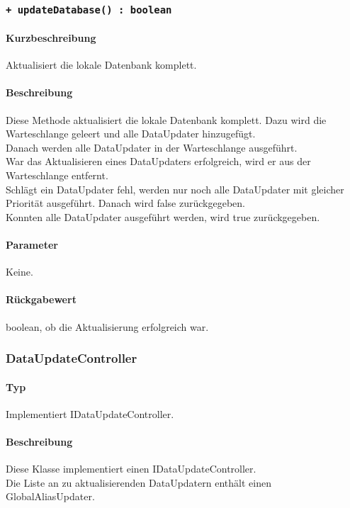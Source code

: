 \subsubsection*{\texttt{+ updateDatabase() : boolean}}%
\paragraph*{Kurzbeschreibung}
Aktualisiert die lokale Datenbank komplett.
\paragraph*{Beschreibung}
Diese Methode aktualisiert die lokale Datenbank komplett. 
Dazu wird die Warteschlange geleert und alle DataUpdater hinzugefügt.\\
Danach werden alle DataUpdater in der Warteschlange ausgeführt.\\
War das Aktualisieren eines DataUpdaters erfolgreich, wird er aus der Warteschlange entfernt.\\
Schlägt ein DataUpdater fehl, werden nur noch alle DataUpdater mit gleicher Priorität 
ausgeführt. Danach wird false zurückgegeben.\\
Konnten alle DataUpdater ausgeführt werden, wird true zurückgegeben.
\paragraph*{Parameter}
Keine.
\paragraph*{Rückgabewert}
boolean, ob die Aktualisierung erfolgreich war.

\subsubsection{DataUpdateController}
\paragraph*{Typ}
Implementiert IDataUpdateController.
\paragraph*{Beschreibung}
Diese Klasse implementiert einen IDataUpdateController.\\
Die Liste an zu aktualisierenden DataUpdatern enthält einen GlobalAliasUpdater.